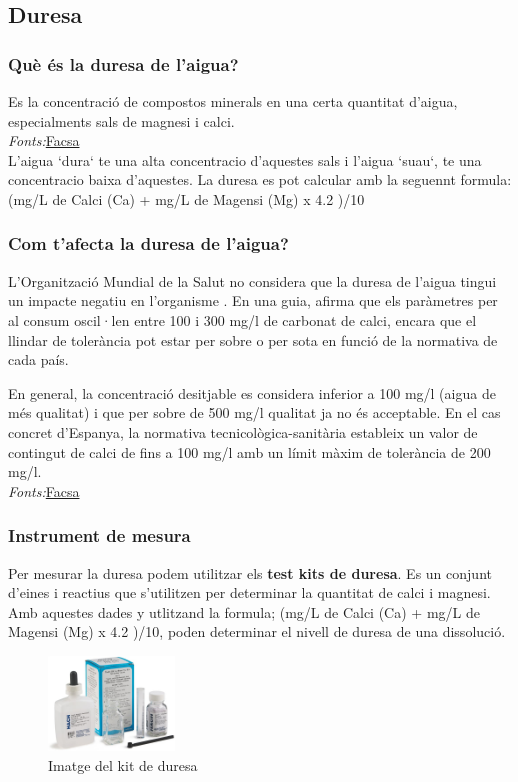 \subsection{Duresa} \label{subsec:duresa}
\subsubsection{Què és la duresa de l'aigua?}
Es la concentració de compostos minerals en una certa quantitat d'aigua, especialments sals de magnesi i calci.\\
\textit{Fonts:}\href{https://www.facsa.com/la-dureza-del-agua/}{Facsa} \\
L'aigua `dura` te una alta concentracio d'aquestes sals i l'aigua `suau`, te una concentracio baixa d'aquestes. La duresa es pot calcular amb la seguennt formula: (mg/L de Calci (Ca) + mg/L de Magensi (Mg) x 4.2 )/10
\subsubsection{Com t’afecta la duresa de l’aigua?}
L'Organització Mundial de la Salut no considera que la duresa de l'aigua tingui un impacte negatiu en l'organisme . En una guia, afirma que els paràmetres per al consum oscil·len entre 100 i 300 mg/l de carbonat de calci, encara que el llindar de tolerància pot estar per sobre o per sota en funció de la normativa de cada país.

En general, la concentració desitjable es considera inferior a 100 mg/l (aigua de més qualitat) i que per sobre de 500 mg/l qualitat ja no és acceptable. En el cas concret d'Espanya, la normativa tecnicològica-sanitària estableix un valor de contingut de calci de fins a 100 mg/l amb un límit màxim de tolerància de 200 mg/l. \\
\textit{Fonts:}\href{https://www.facsa.com/la-dureza-del-agua/}{Facsa}\\
\subsubsection{Instrument de mesura}
Per mesurar la duresa podem utilitzar els \textbf{test kits de duresa}.
Es un conjunt d’eines i reactius que s’utilitzen per determinar la quantitat de calci i magnesi.
Amb aquestes dades y utlitzand la formula; (mg/L de Calci (Ca) + mg/L de Magensi (Mg) x 4.2 )/10, poden determinar el nivell de duresa de una dissolució.
\begin{figure}[H]
\centering
\includegraphics[width=0.3\textwidth]{./Figures/testduresa.png}
\caption{Imatge del kit de duresa}
\label{fig:kitsduresa}
\end{figure}

